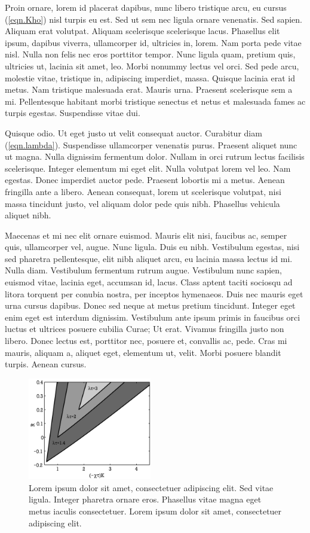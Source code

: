 \documentclass[nochapterpage,bigchapter,linedtoc,longdoc,colorback,accentcolor=tud4c]{tudreport}
\begin{document}
    Proin ornare, lorem id placerat dapibus, nunc libero tristique arcu, eu cursus (\ref{eqn.Kho}) nisl turpis eu est. Sed ut sem nec ligula ornare venenatis. Sed sapien. Aliquam erat volutpat. Aliquam scelerisque scelerisque lacus. Phasellus elit ipsum, dapibus viverra, ullamcorper id, ultricies in, lorem. Nam porta pede vitae nisl. Nulla non felis nec eros porttitor tempor. Nunc ligula quam, pretium quis, ultricies ut, lacinia sit amet, leo. Morbi nonummy lectus vel orci. Sed pede arcu, molestie vitae, tristique in, adipiscing imperdiet, massa. Quisque lacinia erat id metus. Nam tristique malesuada erat. Mauris urna. Praesent scelerisque sem a mi. Pellentesque habitant morbi tristique senectus et netus et malesuada fames ac turpis egestas. Suspendisse vitae dui.

    Quisque odio. Ut eget justo ut velit consequat auctor. Curabitur diam (\ref{eqn.lambda}). Suspendisse ullamcorper venenatis purus. Praesent aliquet nunc ut magna. Nulla dignissim fermentum dolor. Nullam in orci rutrum lectus facilisis scelerisque. Integer elementum mi eget elit. Nulla volutpat lorem vel leo. Nam egestas. Donec imperdiet auctor pede. Praesent lobortis mi a metus. Aenean fringilla ante a libero. Aenean consequat, lorem ut scelerisque volutpat, nisi massa tincidunt justo, vel aliquam dolor pede quis nibh. Phasellus vehicula aliquet nibh.

    Maecenas et mi nec elit ornare euismod. Mauris elit nisi, faucibus ac, semper quis, ullamcorper vel, augue. Nunc ligula. Duis eu nibh. Vestibulum egestas, nisi sed pharetra pellentesque, elit nibh aliquet arcu, eu lacinia massa lectus id mi. Nulla diam. Vestibulum fermentum rutrum augue. Vestibulum nunc sapien, euismod vitae, lacinia eget, accumsan id, lacus. Class aptent taciti sociosqu ad litora torquent per conubia nostra, per inceptos hymenaeos. Duis nec mauris eget urna cursus dapibus. Donec sed neque at metus pretium tincidunt. Integer eget enim eget est interdum dignissim. Vestibulum ante ipsum primis in faucibus orci luctus et ultrices posuere cubilia Curae; Ut erat. Vivamus fringilla justo non libero. Donec lectus est, porttitor nec, posuere et, convallis ac, pede. Cras mi mauris, aliquam a, aliquet eget, elementum ut, velit. Morbi posuere blandit turpis. Aenean cursus.
             \begin{figure}
                 \centering
                 \includegraphics[clip,width=0.48\textwidth]{TUDreport-fig}
                 \caption[Lorem ipsum dolor sit amet]{Lorem ipsum dolor sit amet, consectetuer adipiscing elit. Sed vitae ligula. Integer pharetra ornare eros. Phasellus vitae magna eget metus iaculis consectetuer. Lorem ipsum dolor sit amet, consectetuer adipiscing elit.}
             \end{figure}
\end{document}
